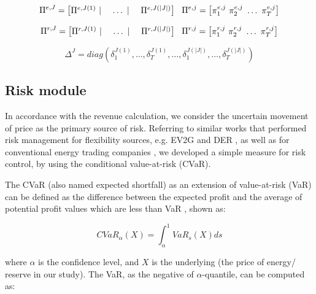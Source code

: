 \begin{equation}
\Pi^{e,J} =
\begin{bmatrix}
\Pi^{e,J(1)}~|~&\dots~|~&\Pi^{e,J(|J|)}
\end{bmatrix} ~~~\\
\Pi^{e,j} = 
\begin{bmatrix}
\pi_1^{e,j}~\pi_2^{e,j}~\dots~\pi_T^{e,j}
\end{bmatrix}
\end{equation}

\begin{equation}
\Pi^{r,J} =
\begin{bmatrix}
\Pi^{r,J(1)}~|~&\dots~|~&\Pi^{r,J(|J|)}
\end{bmatrix} ~~~\\
\Pi^{r,j} = 
\begin{bmatrix}
\pi_1^{r,j}~\pi_2^{r,j}~\dots~\pi_T^{r,j}
\end{bmatrix}
\end{equation}

\begin{equation}
\label{eq:decision-f-revenue-end}
\Delta^J = diag (
\delta_1^{J(1)}, \dots , \delta_T^{J(1)}, \dots, \delta_1^{J(|J|)}, \dots, \delta_T^{J(|J|)})
\end{equation}

\subsection{Risk module}
In accordance with the revenue calculation, we consider the uncertain movement of price as the primary source of risk. Referring to similar works that performed risk management for flexibility sources, e.g. EV2G \cite{Alipour2017} and DER \cite{Han2017}, as well as for conventional energy trading companies \cite{Mohammadi-Ivatloo2013}, we developed a simple measure for risk control, by using the conditional value-at-risk (CVaR).

The CVaR (also named expected shortfall) as an extension of value-at-risk (VaR) can be defined as the difference between the expected profit and the average of potential profit values which are less than VaR \cite{Rockafellar2000}, shown as:

\begin{equation}
\label{eq:CVaR}
CVaR_\alpha (X) = \int_{\alpha}^{1} VaR_s(X) ds
\end{equation}

where $\alpha$ is the confidence level, and $X$ is the underlying (the price of energy/ reserve in our study). The VaR, as the negative of $\alpha$-quantile, can be computed as:

